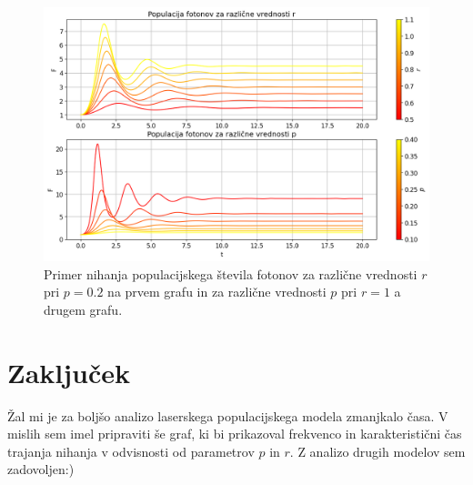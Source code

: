 \documentclass[slovene,11pt,a4paper]{article}
\begin{document}
\begin{figure}[h!]
\centering
\includegraphics[width=13.5cm]{laser3.png}
\caption{Primer nihanja populacijskega števila fotonov za različne vrednosti $r$ pri $p=0.2$ na prvem grafu in za različne vrednosti $p$ pri $r=1$ a drugem grafu.}
\end{figure}

\section{Zaključek}

Žal mi je za boljšo analizo laserskega populacijskega modela zmanjkalo časa. V mislih sem imel pripraviti še graf, ki bi prikazoval frekvenco in karakteristični čas trajanja nihanja v odvisnosti od parametrov $p$ in $r$. Z analizo drugih modelov sem zadovoljen:)
\end{document}
